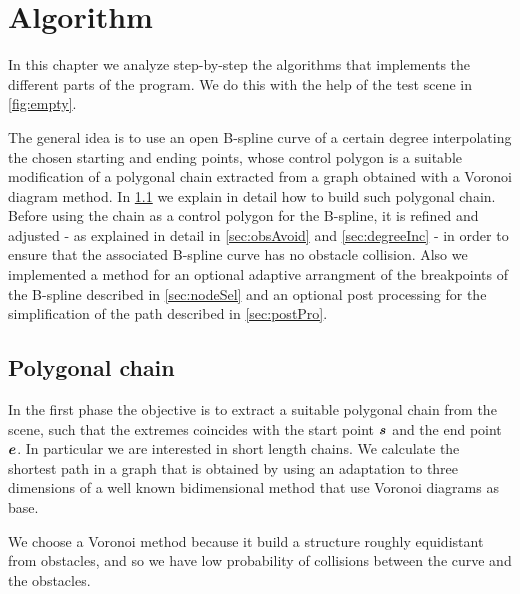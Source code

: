 \documentclass[dissertation.tex]{subfiles}
\begin{document}
\chapter{Algorithm}
In this chapter we analyze step-by-step the algorithms that implements
the different parts of the program. We do this with the help of the
test scene in \cref{fig:empty}.

The general idea is to use an open B-spline curve of a certain degree
interpolating the chosen starting and ending points, whose
control polygon is a suitable modification of a polygonal chain
extracted from a graph
obtained with a Voronoi diagram method. In \cref{sec:polChain} we
explain in detail how to
build such polygonal chain. Before using the chain as a control
polygon for the B-spline, it is refined and adjusted - as explained in
detail in \cref{sec:obsAvoid} and \cref{sec:degreeInc} - in order to
ensure that the associated B-spline curve has no obstacle
collision. Also we implemented a method for an optional adaptive
arrangment of the breakpoints of the B-spline described in
\cref{sec:nodeSel} and an optional post processing for the
simplification of the path described in \cref{sec:postPro}.
\section{Polygonal chain}\label{sec:polChain}
In the first phase the objective is to extract a suitable polygonal chain from
the scene, such that the extremes coincides with the start point $\boldsymbol{s}$
and the end point $\boldsymbol{e}$. In particular we are interested in short length
chains. We calculate the shortest path
in a graph that is obtained by using an adaptation to three
dimensions of a well known bidimensional method
\cite{bhattacharya}\cite{ho-liu}\cite{seda-pich} that use
Voronoi diagrams as base.

We choose a Voronoi method because it build a structure roughly
equidistant from obstacles, and so we have low probability of
collisions between the curve and the obstacles.
\end{document}

